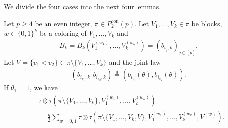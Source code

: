 \documentclass[12pt,reqno]{amsart}
\theoremstyle{plain}
\newcommand{\1}{\mathbf{1}}
\begin{document}
We divide the four cases into the next four lemmas.
\begin{lemma}[Case $\theta_1=1$]\label{lemma: case theta_1=1}
    Let $p \ge 4$ be an even integer, $\pi \in P_2^{\operatorname{con}}(p)$. Let $V_1,\ldots,V_k \in \pi$ be blocks, $w \in \{0,1\}^k$ be a coloring of $V_1,\ldots,V_k$ and
    \begin{align*}
        B_k=B_k\left(V_1^{(w_1)},\ldots,V_k^{(w_k)}\right)=\left(b_{i_j,k}\right)_{j \in [p]}.
    \end{align*}
    Let $V=\{v_1<v_2\} \in \pi\setminus \{V_1,\ldots,V_{k}\}$ and the joint law 
    \begin{align*}
        \left(b_{i_{v_1},k},b_{i_{v_2},k}\right)\overset{d}{=}\left(b_{i_{v_1}}(\theta),b_{i_{v_2}}(\theta)\right).
    \end{align*}
    If $\theta_1=1$, we have
    \begin{align*}
        &\tau\otimes\tau \left(\pi\setminus \{V_1,\ldots,V_{k}\},V_1^{(w_1)},\ldots,V_{k}^{(w_{k})}\right)\\
        &=\frac{q}{2}\sum_{w=0,1}\tau\otimes\tau \left(\pi\setminus \{V_1,\ldots,V_k,V\},V_1^{(w_1)},\ldots,V_{k}^{(w_{k})},V^{(w)}\right).
    \end{align*}
\end{lemma}
\end{document}
